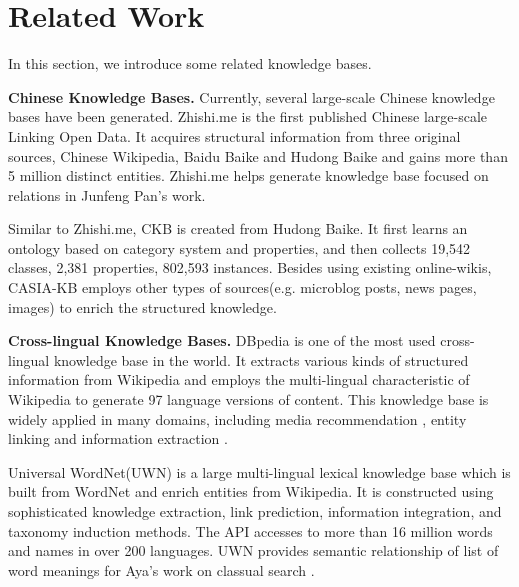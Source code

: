 \documentclass[runningheads,a4paper]{llncs}
\newcommand{\para}[1]{\vspace{0.1cm}\noindent\textbf{#1}}
\begin{document}
\section{Related Work}
\label{sec:work}
In this section, we introduce some related knowledge bases. %

\para{Chinese Knowledge Bases.} Currently, several large-scale Chinese knowledge bases have been generated. Zhishi.me\cite{niu2011zhishi,wang2014publishing} is the first published Chinese large-scale Linking Open Data. It acquires structural information from three original sources, Chinese Wikipedia, Baidu Baike and Hudong Baike and gains more than 5 million distinct entities. Zhishi.me helps generate knowledge base focused on relations in Junfeng Pan's work\cite{pan2012building}.

Similar to Zhishi.me, CKB\cite{wang2012building} is created from Hudong Baike. It first learns an ontology based on category system and properties, and then collects 19,542 classes, 2,381 properties, 802,593 instances. Besides using existing online-wikis, CASIA-KB employs other types of sources(e.g. microblog posts, news pages, images) to enrich the structured knowledge.

\para{Cross-lingual Knowledge Bases.} DBpedia \cite{auer2007dbpedia,mendes2012dbpedia} is one of the most used cross-lingual knowledge base in the world. It extracts various kinds of structured information from Wikipedia and employs the multi-lingual characteristic of Wikipedia to generate 97 language versions of content. This knowledge base is widely applied in many domains, including media recommendation \cite{fernandez2011generic,kaminskas2012knowledge}, entity linking\cite{mendes2011evaluating} and information extraction \cite{dutta2013integrating}. 

Universal WordNet(UWN)\cite{de2012uwn} is a large multi-lingual lexical knowledge base which is built from WordNet and enrich entities from Wikipedia. It is constructed using sophisticated knowledge extraction, link prediction, information integration, and taxonomy induction methods. The API accesses to more than 16 million words and names in over 200 languages. UWN provides semantic relationship of list of word meanings for Aya's work on classual search \cite{al2015conceptual}.

\end{document}
